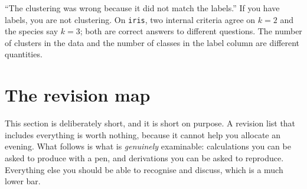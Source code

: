 \documentclass[11pt]{article}
\begin{document}
\begin{caution}
``The clustering was wrong because it did not match the labels.'' If you have
labels, you are not clustering. On \texttt{iris}, two internal criteria agree
on $k = 2$ and the species say $k = 3$; both are correct answers to different
questions. The number of clusters in the data and the number of classes in
the label column are different quantities.
\end{caution}

\section{The revision map}
\label{sec:map}

This section is deliberately short, and it is short on purpose. A revision
list that includes everything is worth nothing, because it cannot help you
allocate an evening. What follows is what is \emph{genuinely} examinable:
calculations you can be asked to produce with a pen, and derivations you can
be asked to reproduce. Everything else you should be able to recognise and
discuss, which is a much lower bar.
\end{document}
